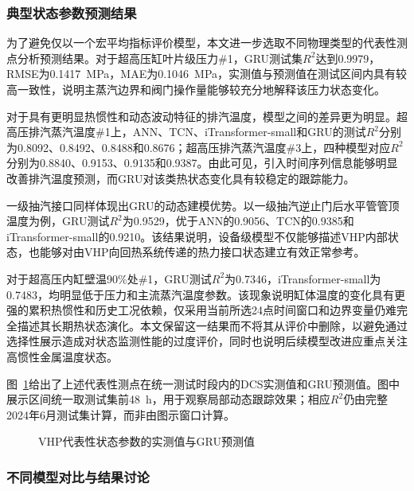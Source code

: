 \subsubsection{典型状态参数预测结果}

为了避免仅以一个宏平均指标评价模型，本文进一步选取不同物理类型的代表性测点分析预测结果。对于超高压缸叶片级压力\#1，GRU测试集$R^2$达到0.9979，RMSE为0.1417~MPa，MAE为0.1046~MPa，实测值与预测值在测试区间内具有较高一致性，说明主蒸汽边界和阀门操作量能够较充分地解释该压力状态变化。

对于具有更明显热惯性和动态波动特征的排汽温度，模型之间的差异更为明显。超高压排汽蒸汽温度\#1上，ANN、TCN、iTransformer-small和GRU的测试$R^2$分别为0.8092、0.8492、0.8488和0.8676；超高压排汽蒸汽温度\#3上，四种模型对应$R^2$分别为0.8840、0.9153、0.9135和0.9387。由此可见，引入时间序列信息能够明显改善排汽温度预测，而GRU对该类热状态变化具有较稳定的跟踪能力。

一级抽汽接口同样体现出GRU的动态建模优势。以一级抽汽逆止门后水平管管顶温度为例，GRU测试$R^2$为0.9529，优于ANN的0.9056、TCN的0.9385和iTransformer-small的0.9210。该结果说明，设备级模型不仅能够描述VHP内部状态，也能够对由VHP向回热系统传递的热力接口状态建立有效正常参考。

对于超高压内缸壁温90\%处\#1，GRU测试$R^2$为0.7346，iTransformer-small为0.7483，均明显低于压力和主流蒸汽温度参数。该现象说明缸体温度的变化具有更强的累积热惯性和历史工况依赖，仅采用当前所选24点时间窗口和边界变量仍难完全描述其长期热状态演化。本文保留这一结果而不将其从评价中删除，以避免通过选择性展示造成对状态监测性能的过度评价，同时也说明后续模型改进应重点关注高惯性金属温度状态。

图~\ref{fig:prediction_examples}给出了上述代表性测点在统一测试时段内的DCS实测值和GRU预测值。图中展示区间统一取测试集前48~h，用于观察局部动态跟踪效果；相应$R^2$仍由完整2024年6月测试集计算，而非由图示窗口计算。

\begin{figure}[htbp]
    \centering
    \caption{VHP代表性状态参数的实测值与GRU预测值}
    \label{fig:prediction_examples}
\end{figure}

\subsubsection{不同模型对比与结果讨论}


